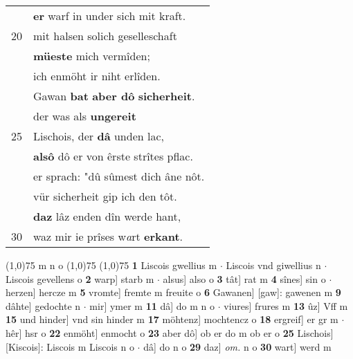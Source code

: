 \documentclass[8pt,a4paper,notitlepage]{article}
\begin{document}
\begin{table}[ht]
\begin{minipage}[t]{0.5\linewidth}
\begin{tabular}{rl}
 & \textbf{er} warf in under sich mit kraft.\\ 
20 & mit halsen solich geselleschaft\\ 
 & \textbf{müeste} mich vermîden;\\ 
 & ich enmöht ir niht erlîden.\\ 
 & Gawan \textbf{bat} \textbf{aber dô} \textbf{sicherheit}.\\ 
 & der was als \textbf{ungereit}\\ 
25 & Lischois, der \textbf{dâ} unden lac,\\ 
 & \textbf{alsô} dô er von êrste strîtes pflac.\\ 
 & er sprach: "dû sûmest dich âne nôt.\\ 
 & vür sicherheit gip ich den tôt.\\ 
 & \textbf{daz} lâz enden dîn werde hant,\\ 
30 & waz mir ie prîses w\textit{a}rt \textbf{erkant}.\\ 
\end{tabular}
\scriptsize
\line(1,0){75} \newline
m n o \newline
\line(1,0){75} \newline
\newline
\line(1,0){75} \newline
\textbf{1} Liscois gwellius m  $\cdot$ Liscois vnd giwellius n  $\cdot$ Liscois gevellens o \textbf{2} warp] starb m  $\cdot$ alsus] also o \textbf{3} tât] rat m \textbf{4} sînes] sin o  $\cdot$ herzen] hercze m \textbf{5} vromte] fremte m freuite o \textbf{6} Gawanen] [gaw]: gawenen m \textbf{9} dâhte] gedochte n  $\cdot$ mir] ymer m \textbf{11} dâ] do m n o  $\cdot$ viures] frures m \textbf{13} ûz] Vff m \textbf{15} und hinder] vnd sin hinder m \textbf{17} möhtenz] mochtencz o \textbf{18} ergreif] er gr m  $\cdot$ hêr] hsr o \textbf{22} enmöht] enmocht o \textbf{23} aber dô] ob er do m ob er o \textbf{25} Lischois] [Kiscois]: Liscois m Liscois n o  $\cdot$ dâ] do n o \textbf{29} daz] \textit{om.} n o \textbf{30} wart] werd m \newline
\end{minipage}
\end{table}
\newpage
\end{document}
